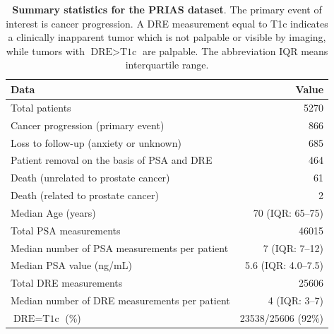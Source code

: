 \begin{table}
\captionsetup{justification=justified}
\small\sf\centering
\caption{\textbf{Summary statistics for the PRIAS dataset}. The primary event of interest is cancer progression. A DRE measurement equal to T1c\cite{schroder1992tnm} indicates a clinically inapparent tumor which is not palpable or visible by imaging, while tumors with $\mbox{DRE} > \mbox{T1c}$ are palpable. The abbreviation IQR means interquartile range.}
\label{table:prias_summary}
\begin{tabular}{lr}
\toprule
Data & Value\\
\midrule
Total patients & 5270\\
Cancer progression (primary event) & 866\\
Loss to follow-up (anxiety or unknown) & 685\\
Patient removal on the basis of PSA and DRE & 464\\
Death (unrelated to prostate cancer) & 61\\
Death (related to prostate cancer) & 2\\
\midrule
Median Age (years) & 70 (IQR: 65--75)\\
Total PSA measurements & 46015\\
Median number of PSA measurements per patient &  7 (IQR: 7--12)\\
Median PSA value (ng/mL) & 5.6 (IQR: 4.0--7.5)\\
Total DRE measurements & 25606\\
Median number of DRE measurements per patient & 4 (IQR: 3--7)\\
$\mbox{DRE} = \mbox{T1c}$ (\%) & 23538/25606 (92\%) \\
\bottomrule
\end{tabular}
\end{table}

